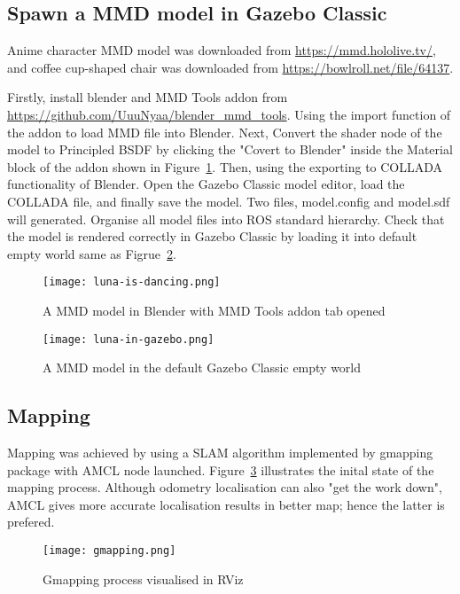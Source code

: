 \subsection{Spawn a MMD model in Gazebo Classic}

Anime character MMD model was downloaded from \url{https://mmd.hololive.tv/}, and coffee cup-shaped chair was downloaded from \url{https://bowlroll.net/file/64137}.

Firstly, install blender and MMD Tools addon from \url{https://github.com/UuuNyaa/blender_mmd_tools}. Using the import function of the addon to load MMD file into Blender. Next, Convert the shader node of the model to Principled BSDF by clicking the "Covert to Blender"  inside the Material block of the addon shown in Figure~\ref{fig:luna-is-dancing}. Then, using the exporting to COLLADA functionality of Blender. Open the Gazebo Classic model editor, load the COLLADA file, and finally save the model. Two files, model.config and model.sdf will generated. Organise all model files into ROS standard hierarchy. Check that the model is rendered correctly in Gazebo Classic by loading it into default empty world same as Figrue~\ref{fig:luna-in-gazebo}.

\begin{figure}[htbp]
   \centering
   \texttt{[image: luna-is-dancing.png]}
   \caption{A MMD model in Blender with MMD Tools addon tab opened}
   \label{fig:luna-is-dancing}
\end{figure}

\begin{figure}[htbp]
   \centering
   \texttt{[image: luna-in-gazebo.png]}
   \caption{A MMD model in the default Gazebo Classic empty world}
   \label{fig:luna-in-gazebo}
\end{figure}


\subsection{Mapping}

Mapping was achieved by using a SLAM algorithm implemented by gmapping package with AMCL node launched. Figure~\ref{fig:gmapping} illustrates the inital state of the mapping process. Although odometry localisation can also "get the work down", AMCL gives more accurate localisation results in better map; hence the latter is prefered.

\begin{figure}[htbp]
   \centering
   \texttt{[image: gmapping.png]}
   \caption{Gmapping process visualised in RViz}
   \label{fig:gmapping}
\end{figure}

